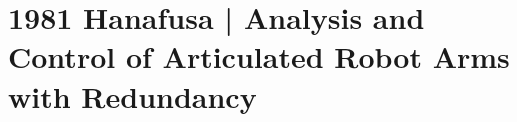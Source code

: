 \section{1981 Hanafusa | Analysis and Control of Articulated Robot Arms with Redundancy}

\cite{hanafusa1981} 

